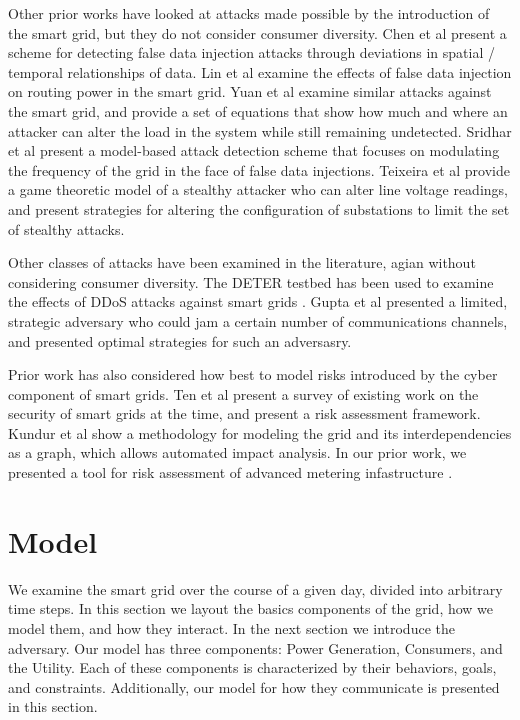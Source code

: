 \documentclass[conference]{IEEEtran}
\begin{document}
Other prior works have looked at attacks made possible by the introduction of the smart grid, but they do not consider consumer diversity.  Chen et al \cite{chen2015detection} present a scheme for detecting false data injection attacks through deviations in spatial / temporal relationships of data.  Lin et al \cite{lin2012false} examine the effects of false data injection on routing power in the smart grid.  Yuan et al \cite{yuan2011modeling} examine similar attacks against the smart grid, and provide a set of equations that show how much and where an attacker can alter the load in the system while still remaining undetected.  Sridhar et al \cite{sridhar2014model} present a model-based attack detection scheme that focuses on modulating the frequency of the grid in the face of false data injections.  Teixeira et al \cite{teixeira2014security} provide a game theoretic model of a stealthy attacker who can alter line voltage readings, and present strategies for altering the configuration of substations to limit the set of stealthy attacks.  

Other classes of attacks have been examined in the literature, agian without considering consumer diversity.  The DETER testbed has been used to examine the effects of DDoS attacks against smart grids \cite{hussain2012ncs}.  Gupta et al \cite{gupta2010optimal} presented a limited, strategic adversary who could jam a certain number of communications channels, and presented optimal strategies for such an adversasry.  

Prior work has also considered how best to model risks introduced by the cyber component of smart grids.  Ten et al \cite{ten2010cybersecurity} present a survey of existing work on the security of smart grids at the time, and present a risk assessment framework.  Kundur et al \cite{kundur2010towards} show a methodology for modeling the grid and its interdependencies as a graph, which allows automated impact analysis.  In our prior work, we presented a tool for risk assessment of advanced metering infastructure \cite{shawly2014risk}.

\section{Model}
\label{Model}

We examine the smart grid over the course of a given day, divided into arbitrary time steps.  In this section we layout the basics components of the grid, how we model them, and how they interact.  In the next section we introduce the adversary.  Our model has three components: Power Generation, Consumers, and the Utility.  Each of these components is characterized by their behaviors, goals, and constraints.  Additionally, our model for how they communicate is presented in this section.  
\end{document}
